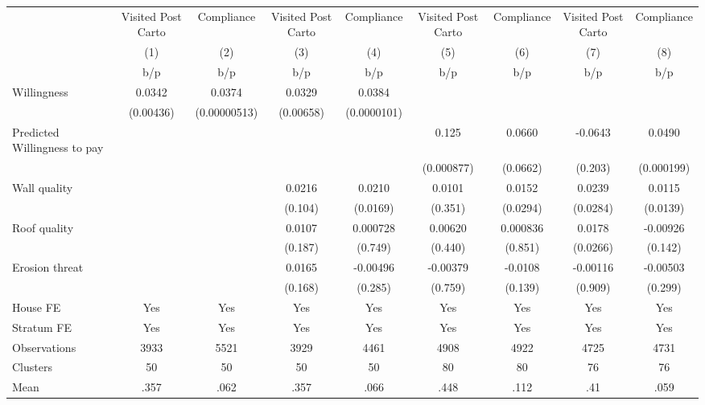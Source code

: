 {
\def\sym#1{\ifmmode^{#1}\else\(^{#1}\)\fi}
\begin{tabular}{l*{8}{c}}
\toprule
                &\multicolumn{1}{c}{Visited Post Carto}&\multicolumn{1}{c}{Compliance}&\multicolumn{1}{c}{Visited Post Carto}&\multicolumn{1}{c}{Compliance}&\multicolumn{1}{c}{Visited Post Carto}&\multicolumn{1}{c}{Compliance}&\multicolumn{1}{c}{Visited Post Carto}&\multicolumn{1}{c}{Compliance}\\
                &\multicolumn{1}{c}{(1)}&\multicolumn{1}{c}{(2)}&\multicolumn{1}{c}{(3)}&\multicolumn{1}{c}{(4)}&\multicolumn{1}{c}{(5)}&\multicolumn{1}{c}{(6)}&\multicolumn{1}{c}{(7)}&\multicolumn{1}{c}{(8)}\\
                &      b/p&      b/p&      b/p&      b/p&      b/p&      b/p&      b/p&      b/p\\
\midrule
Willingness     &   0.0342&   0.0374&   0.0329&   0.0384&         &         &         &         \\
                &(0.00436)&(0.00000513)&(0.00658)&(0.0000101)&         &         &         &         \\
Predicted Willingness to pay&         &         &         &         &    0.125&   0.0660&  -0.0643&   0.0490\\
                &         &         &         &         &(0.000877)& (0.0662)&  (0.203)&(0.000199)\\
Wall quality    &         &         &   0.0216&   0.0210&   0.0101&   0.0152&   0.0239&   0.0115\\
                &         &         &  (0.104)& (0.0169)&  (0.351)& (0.0294)& (0.0284)& (0.0139)\\
Roof quality    &         &         &   0.0107& 0.000728&  0.00620& 0.000836&   0.0178& -0.00926\\
                &         &         &  (0.187)&  (0.749)&  (0.440)&  (0.851)& (0.0266)&  (0.142)\\
Erosion threat  &         &         &   0.0165& -0.00496& -0.00379&  -0.0108& -0.00116& -0.00503\\
                &         &         &  (0.168)&  (0.285)&  (0.759)&  (0.139)&  (0.909)&  (0.299)\\
House FE        &      Yes&      Yes&      Yes&      Yes&      Yes&      Yes&      Yes&      Yes\\
Stratum FE      &      Yes&      Yes&      Yes&      Yes&      Yes&      Yes&      Yes&      Yes\\
\midrule
Observations    &     3933&     5521&     3929&     4461&     4908&     4922&     4725&     4731\\
Clusters        &       50&       50&       50&       50&       80&       80&       76&       76\\
Mean            &     .357&     .062&     .357&     .066&     .448&     .112&      .41&     .059\\
\bottomrule
\end{tabular}
}
